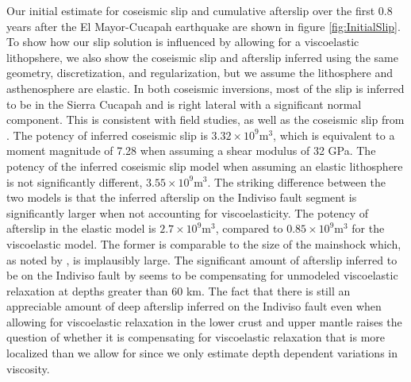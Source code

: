 \documentclass[1p]{elsarticle}
\begin{document}
Our initial estimate for coseismic slip and cumulative afterslip over the first 0.8 years after the El Mayor-Cucapah earthquake are shown in figure \ref{fig:InitialSlip}. To show how our slip solution is influenced by allowing for a viscoelastic lithopshere, we also show the coseismic slip and afterslip inferred using the same geometry, discretization, and regularization, but we assume the lithosphere and asthenosphere are elastic.  In both coseismic inversions, most of the slip is inferred to be in the Sierra Cucapah and is right lateral with a significant normal component. This is consistent with field studies, \cite{Fletcher2014} as well as the coseismic slip from \cite{Wei2011}.  The potency of inferred coseismic slip is $3.32\times 10^{9} \mathrm{m}^3$, which is equivalent to a moment magnitude of 7.28 when assuming a shear modulus of 32 GPa. The potency of the inferred coseismic slip model when assuming an elastic lithosphere is not significantly different, $3.55\times 10^9 \mathrm{m}^3$.  The striking difference between the two models is that the inferred afterslip on the Indiviso fault segment is significantly larger when not accounting for viscoelasticity.  The potency of afterslip in the elastic model is $2.7\times 10^9 \mathrm{m}^3$, compared to $0.85\times 10^9 \mathrm{m}^3$ for the viscoelastic model.  The former is comparable to the size of the mainshock which, as noted by \cite{Rollins2015}, is implausibly large. The significant amount of afterslip inferred to be on the Indiviso fault by \cite{Rollins2015} seems to be compensating for unmodeled viscoelastic relaxation at depths greater than $60$ km.   The fact that there is still an appreciable amount of deep afterslip inferred on the Indiviso fault even when allowing for viscoelastic relaxation in the lower crust and upper mantle raises the question of whether it is compensating for viscoelastic relaxation that is more localized than we allow for since we only estimate depth dependent variations in viscosity.  
\end{document}
